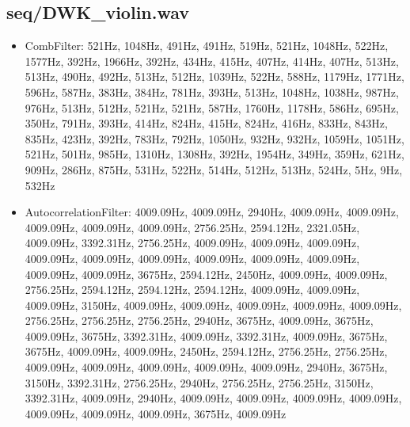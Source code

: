 \documentclass{classrep}
\begin{document}
\subsection{seq/DWK\_violin.wav}
\begin{itemize}
 \item CombFilter: 521Hz, 1048Hz, 491Hz, 491Hz, 519Hz, 521Hz, 1048Hz, 522Hz, 1577Hz, 392Hz, 1966Hz, 392Hz, 434Hz, 415Hz, 407Hz, 414Hz, 407Hz, 513Hz, 513Hz, 490Hz, 492Hz, 513Hz, 512Hz, 1039Hz, 522Hz, 588Hz, 1179Hz, 1771Hz, 596Hz, 587Hz, 383Hz, 384Hz, 781Hz, 393Hz, 513Hz, 1048Hz, 1038Hz, 987Hz, 976Hz, 513Hz, 512Hz, 521Hz, 521Hz, 587Hz, 1760Hz, 1178Hz, 586Hz, 695Hz, 350Hz, 791Hz, 393Hz, 414Hz, 824Hz, 415Hz, 824Hz, 416Hz, 833Hz, 843Hz, 835Hz, 423Hz, 392Hz, 783Hz, 792Hz, 1050Hz, 932Hz, 932Hz, 1059Hz, 1051Hz, 521Hz, 501Hz, 985Hz, 1310Hz, 1308Hz, 392Hz, 1954Hz, 349Hz, 359Hz, 621Hz, 909Hz, 286Hz, 875Hz, 531Hz, 522Hz, 514Hz, 512Hz, 513Hz, 524Hz, 5Hz, 9Hz, 532Hz
 \item AutocorrelationFilter: 4009.09Hz, 4009.09Hz, 2940Hz, 4009.09Hz, 4009.09Hz, 4009.09Hz, 4009.09Hz, 4009.09Hz, 2756.25Hz, 2594.12Hz, 2321.05Hz, 4009.09Hz, 3392.31Hz, 2756.25Hz, 4009.09Hz, 4009.09Hz, 4009.09Hz, 4009.09Hz, 4009.09Hz, 4009.09Hz, 4009.09Hz, 4009.09Hz, 4009.09Hz, 4009.09Hz, 4009.09Hz, 3675Hz, 2594.12Hz, 2450Hz, 4009.09Hz, 4009.09Hz, 2756.25Hz, 2594.12Hz, 2594.12Hz, 2594.12Hz, 4009.09Hz, 4009.09Hz, 4009.09Hz, 3150Hz, 4009.09Hz, 4009.09Hz, 4009.09Hz, 4009.09Hz, 4009.09Hz, 2756.25Hz, 2756.25Hz, 2756.25Hz, 2940Hz, 3675Hz, 4009.09Hz, 3675Hz, 4009.09Hz, 3675Hz, 3392.31Hz, 4009.09Hz, 3392.31Hz, 4009.09Hz, 3675Hz, 3675Hz, 4009.09Hz, 4009.09Hz, 2450Hz, 2594.12Hz, 2756.25Hz, 2756.25Hz, 4009.09Hz, 4009.09Hz, 4009.09Hz, 4009.09Hz, 4009.09Hz, 2940Hz, 3675Hz, 3150Hz, 3392.31Hz, 2756.25Hz, 2940Hz, 2756.25Hz, 2756.25Hz, 3150Hz, 3392.31Hz, 4009.09Hz, 2940Hz, 4009.09Hz, 4009.09Hz, 4009.09Hz, 4009.09Hz, 4009.09Hz, 4009.09Hz, 4009.09Hz, 3675Hz, 4009.09Hz
\end{itemize}
\end{document}
